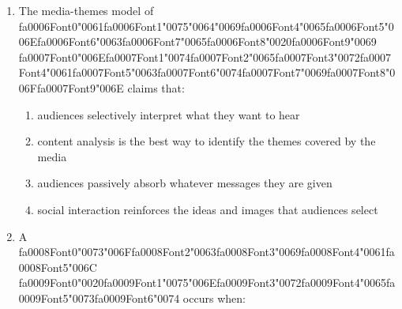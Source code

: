 \documentclass[12pt]{article}
\begin{document}
\begin{enumerate}[label=\arabic*.]
\begin{enumerate}[label=(\alph*)]
    \item both boys and girls being closely attached to their mothers, but then boys breaking away
    \item girls being attached to their mothers but then breaking away
    \item boys being attached to their fathers and girls to their mothers
    \item both boys and girls being closely attached to their fathers, but girls breaking away
\end{enumerate}
\item The media-themes model of {\csname fa0006Font0\endcsname\char"0061}{\csname fa0006Font1\endcsname\char"0075}{\char"0064}{\char"0069}{\csname fa0006Font4\endcsname\char"0065}{\csname fa0006Font5\endcsname\char"006E}{\csname fa0006Font6\endcsname\char"0063}{\csname fa0006Font7\endcsname\char"0065}{\csname fa0006Font8\endcsname\char"0020}{\csname fa0006Font9\endcsname\char"0069} {\csname fa0007Font0\endcsname\char"006E}{\csname fa0007Font1\endcsname\char"0074}{\csname fa0007Font2\endcsname\char"0065}{\csname fa0007Font3\endcsname\char"0072}{\csname fa0007Font4\endcsname\char"0061}{\csname fa0007Font5\endcsname\char"0063}{\csname fa0007Font6\endcsname\char"0074}{\csname fa0007Font7\endcsname\char"0069}{\csname fa0007Font8\endcsname\char"006F}{\csname fa0007Font9\endcsname\char"006E} claims that:
\begin{enumerate}[label=(\alph*)]
    \item audiences selectively interpret what they want to hear
    \item content analysis is the best way to identify the themes covered by the media
    \item audiences passively absorb whatever messages they are given
    \item social interaction reinforces the ideas and images that audiences select
\end{enumerate}
\item A {\csname fa0008Font0\endcsname\char"0073}{\char"006F}{\csname fa0008Font2\endcsname\char"0063}{\csname fa0008Font3\endcsname\char"0069}{\csname fa0008Font4\endcsname\char"0061}{\csname fa0008Font5\endcsname\char"006C} {\csname fa0009Font0\endcsname\char"0020}{\csname fa0009Font1\endcsname\char"0075}{\char"006E}{\csname fa0009Font3\endcsname\char"0072}{\csname fa0009Font4\endcsname\char"0065}{\csname fa0009Font5\endcsname\char"0073}{\csname fa0009Font6\endcsname\char"0074} occurs when:

\end{enumerate}
\end{document}
